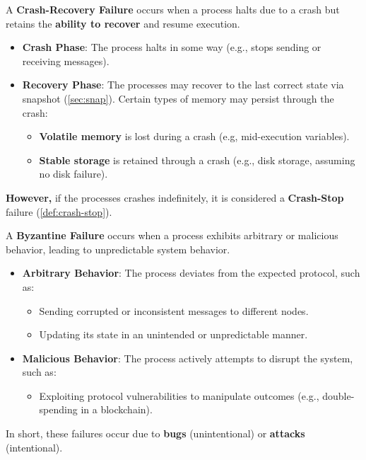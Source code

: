 \newpage 

\begin{Def}

    A \textbf{Crash-Recovery Failure} occurs when a process halts due to a crash but retains the \textbf{ability to recover} and resume execution. 

    \begin{itemize}
        \item \textbf{Crash Phase}: The process halts in some way (e.g., stops sending or receiving messages).
        \item \textbf{Recovery Phase}: The processes may recover to the last correct state via snapshot (\ref{sec:snap}). Certain types of memory may persist through the crash:
        \begin{itemize}
            \item \textbf{Volatile memory} is lost during a crash (e.g, mid-execution variables).
            \item \textbf{Stable storage} is retained through a crash (e.g., disk storage, assuming no disk failure).
        \end{itemize}
    \end{itemize}

    \noindent
    \textbf{However,} if the processes crashes indefinitely, it is considered a \textbf{Crash-Stop} failure (\ref{def:crash-stop}).
\end{Def}

\begin{Def}

    A \textbf{Byzantine Failure} occurs when a process exhibits arbitrary or malicious behavior, leading to unpredictable system behavior.

    \begin{itemize}
        \item \textbf{Arbitrary Behavior}: The process deviates from the expected protocol, such as:
        \begin{itemize}
            \item Sending corrupted or inconsistent messages to different nodes.
            \item Updating its state in an unintended or unpredictable manner.
        \end{itemize}

        \item \textbf{Malicious Behavior}: The process actively attempts to disrupt the system, such as:
        \begin{itemize}
            \item Exploiting protocol vulnerabilities to manipulate outcomes (e.g., double-spending in a blockchain).
        \end{itemize}
    \end{itemize}

    \noindent
    In short, these failures occur due to \textbf{bugs} (unintentional) or \textbf{attacks} (intentional).
\end{Def}

